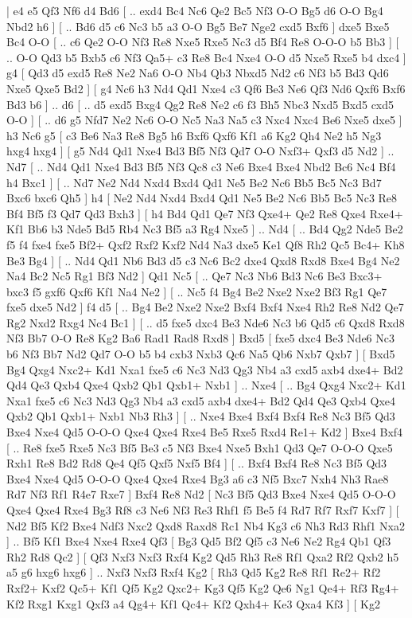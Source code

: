 \makegametitle 
|   e4   e5    Qf3   Nf6    d4   Bd6 [ .. exd4  Bc4 Nc6  Qe2 Bc5  Nf3 O-O  Bg5 d6  O-O Bg4  Nbd2 h6   ]  [ .. Bd6  d5 c6  Nc3 b5  a3 O-O  Bg5 Be7  Nge2 cxd5  Bxf6   ]  dxe5   Bxe5    Bc4   O-O    [ .. c6  Qe2 O-O  Nf3 Re8  Nxe5 Rxe5  Nc3 d5  Bf4 Re8  O-O-O b5  Bb3   ]  [ .. O-O  Qd3 b5  Bxb5 c6  Nf3 Qa5+  c3 Re8  Bc4 Nxe4  O-O d5  Nxe5 Rxe5  b4 dxc4   ]  g4 [  Qd3 d5  exd5 Re8  Ne2 Na6  O-O Nb4  Qb3 Nbxd5  Nd2 c6  Nf3 b5  Bd3 Qd6  Nxe5 Qxe5  Bd2   ]  [  g4 Nc6  h3 Nd4  Qd1 Nxe4  c3 Qf6  Be3 Ne6  Qf3 Nd6  Qxf6 Bxf6  Bd3 b6   ] .. d6 [ .. d5  exd5 Bxg4  Qg2 Re8  Ne2 c6  f3 Bh5  Nbc3 Nxd5  Bxd5 cxd5  O-O   ]  [ .. d6  g5 Nfd7  Ne2 Nc6  O-O Nc5  Na3 Na5  c3 Nxc4  Nxc4 Be6  Nxe5 dxe5   ]  h3   Nc6    g5 [  c3 Be6  Na3 Re8  Bg5 h6  Bxf6 Qxf6  Kf1 a6  Kg2 Qh4  Ne2 h5  Ng3 hxg4  hxg4   ]  [  g5 Nd4  Qd1 Nxe4  Bd3 Bf5  Nf3 Qd7  O-O Nxf3+  Qxf3 d5  Nd2   ] .. Nd7 [ .. Nd4  Qd1 Nxe4  Bd3 Bf5  Nf3 Qc8  c3 Ne6  Bxe4 Bxe4  Nbd2 Bc6  Nc4 Bf4  h4 Bxc1   ]  [ .. Nd7  Ne2 Nd4  Nxd4 Bxd4  Qd1 Ne5  Be2 Nc6  Bb5 Bc5  Nc3 Bd7  Bxc6 bxc6  Qh5   ]  h4 [  Ne2 Nd4  Nxd4 Bxd4  Qd1 Ne5  Be2 Nc6  Bb5 Bc5  Nc3 Re8  Bf4 Bf5  f3 Qd7  Qd3 Bxh3   ]  [  h4 Bd4  Qd1 Qe7  Nf3 Qxe4+  Qe2 Re8  Qxe4 Rxe4+  Kf1 Bb6  b3 Nde5  Bd5 Rb4  Nc3 Bf5  a3 Rg4  Nxe5   ] .. Nd4 [ .. Bd4  Qg2 Nde5  Be2 f5  f4 fxe4  fxe5 Bf2+  Qxf2 Rxf2  Kxf2 Nd4  Na3 dxe5  Ke1 Qf8  Rh2 Qc5  Bc4+ Kh8  Be3 Bg4   ]  [ .. Nd4  Qd1 Nb6  Bd3 d5  c3 Nc6  Bc2 dxe4  Qxd8 Rxd8  Bxe4 Bg4  Ne2 Na4  Bc2 Nc5  Rg1 Bf3  Nd2   ]  Qd1   Nc5 [ .. Qe7  Nc3 Nb6  Bd3 Nc6  Be3 Bxc3+  bxc3 f5  gxf6 Qxf6  Kf1 Na4  Ne2   ]  [ .. Nc5  f4 Bg4  Be2 Nxe2  Nxe2 Bf3  Rg1 Qe7  fxe5 dxe5  Nd2   ]  f4   d5 [ .. Bg4  Be2 Nxe2  Nxe2 Bxf4  Bxf4 Nxe4  Rh2 Re8  Nd2 Qe7  Rg2 Nxd2  Rxg4 Nc4  Bc1   ]  [ .. d5  fxe5 dxc4  Be3 Nde6  Nc3 b6  Qd5 c6  Qxd8 Rxd8  Nf3 Bb7  O-O Re8  Kg2 Ba6  Rad1 Rad8  Rxd8   ]  Bxd5 [  fxe5 dxc4  Be3 Nde6  Nc3 b6  Nf3 Bb7  Nd2 Qd7  O-O b5  b4 cxb3  Nxb3 Qc6  Na5 Qb6  Nxb7 Qxb7   ]  [  Bxd5 Bg4  Qxg4 Nxc2+  Kd1 Nxa1  fxe5 c6  Nc3 Nd3  Qg3 Nb4  a3 cxd5  axb4 dxe4+  Bd2 Qd4  Qe3 Qxb4  Qxe4 Qxb2  Qb1 Qxb1+  Nxb1   ] .. Nxe4 [ .. Bg4  Qxg4 Nxc2+  Kd1 Nxa1  fxe5 c6  Nc3 Nd3  Qg3 Nb4  a3 cxd5  axb4 dxe4+  Bd2 Qd4  Qe3 Qxb4  Qxe4 Qxb2  Qb1 Qxb1+  Nxb1 Nb3  Rh3   ]  [ .. Nxe4  Bxe4 Bxf4  Bxf4 Re8  Nc3 Bf5  Qd3 Bxe4  Nxe4 Qd5  O-O-O Qxe4  Qxe4 Rxe4  Be5 Rxe5  Rxd4 Re1+  Kd2   ]  Bxe4   Bxf4    [ .. Re8  fxe5 Rxe5  Nc3 Bf5  Be3 c5  Nf3 Bxe4  Nxe5 Bxh1  Qd3 Qe7  O-O-O Qxe5  Rxh1 Re8  Bd2 Rd8  Qe4 Qf5  Qxf5 Nxf5  Bf4   ]  [ .. Bxf4  Bxf4 Re8  Nc3 Bf5  Qd3 Bxe4  Nxe4 Qd5  O-O-O Qxe4  Qxe4 Rxe4  Bg3 a6  c3 Nf5  Bxc7 Nxh4  Nh3 Rae8  Rd7 Nf3  Rf1 R4e7  Rxe7   ]  Bxf4   Re8    Nd2 [  Nc3 Bf5  Qd3 Bxe4  Nxe4 Qd5  O-O-O Qxe4  Qxe4 Rxe4  Bg3 Rf8  c3 Ne6  Nf3 Re3  Rhf1 f5  Be5 f4  Rd7 Rf7  Rxf7 Kxf7   ]  [  Nd2 Bf5  Kf2 Bxe4  Ndf3 Nxc2  Qxd8 Raxd8  Rc1 Nb4  Kg3 c6  Nh3 Rd3  Rhf1 Nxa2   ] .. Bf5    Kf1   Bxe4    Nxe4   Rxe4    Qf3 [  Bg3 Qd5  Bf2 Qf5  c3 Ne6  Ne2 Rg4  Qb1 Qf3  Rh2 Rd8  Qc2   ]  [  Qf3 Nxf3  Nxf3 Rxf4  Kg2 Qd5  Rh3 Re8  Rf1 Qxa2  Rf2 Qxb2  h5 a5  g6 hxg6  hxg6   ] .. Nxf3    Nxf3   Rxf4    Kg2 [  Rh3 Qd5  Kg2 Re8  Rf1 Re2+  Rf2 Rxf2+  Kxf2 Qc5+  Kf1 Qf5  Kg2 Qxc2+  Kg3 Qf5  Kg2 Qe6  Ng1 Qe4+  Rf3 Rg4+  Kf2 Rxg1  Kxg1 Qxf3  a4 Qg4+  Kf1 Qc4+  Kf2 Qxh4+  Ke3 Qxa4  Kf3   ]  [  Kg2 